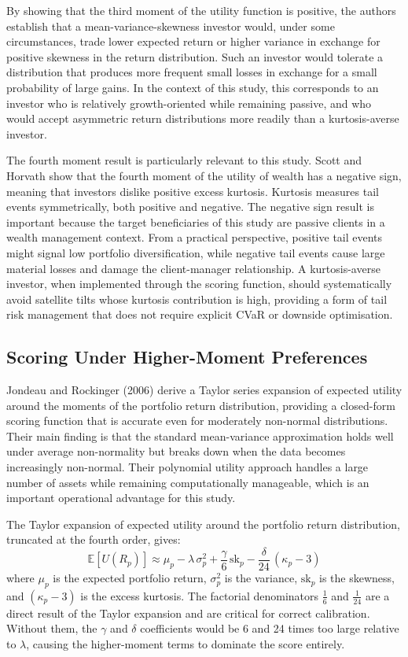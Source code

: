\documentclass[12pt, a4paper]{article}
\begin{document}
By showing that the third moment of the utility function is positive, the authors establish
that a mean-variance-skewness investor would, under some circumstances, trade lower expected
return or higher variance in exchange for positive skewness in the return distribution. Such
an investor would tolerate a distribution that produces more frequent small losses in exchange
for a small probability of large gains. In the context of this study, this corresponds to an
investor who is relatively growth-oriented while remaining passive, and who would accept
asymmetric return distributions more readily than a kurtosis-averse investor.

The fourth moment result is particularly relevant to this study. Scott and Horvath show that
the fourth moment of the utility of wealth has a negative sign, meaning that investors dislike
positive excess kurtosis. Kurtosis measures tail events symmetrically, both positive and
negative. The negative sign result is important because the target beneficiaries of this
study are passive clients in a wealth management context. From a practical perspective,
positive tail events might signal low portfolio diversification, while negative tail events
cause large material losses and damage the client-manager relationship. A kurtosis-averse
investor, when implemented through the scoring function, should systematically avoid satellite
tilts whose kurtosis contribution is high, providing a form of tail risk management that does
not require explicit CVaR or downside optimisation.

\subsection{Scoring Under Higher-Moment Preferences}

Jondeau and Rockinger (2006) derive a Taylor series expansion of expected utility around the
moments of the portfolio return distribution, providing a closed-form scoring function that
is accurate even for moderately non-normal distributions. Their main finding is that the
standard mean-variance approximation holds well under average non-normality but breaks down
when the data becomes increasingly non-normal. Their polynomial utility approach handles a
large number of assets while remaining computationally manageable, which is an important
operational advantage for this study.

The Taylor expansion of expected utility around the portfolio return distribution, truncated
at the fourth order, gives:
\begin{equation}
  \mathbb{E}\!\left[U(R_p)\right] \approx
  \mu_p
  - \lambda\,\sigma^2_p
  + \frac{\gamma}{6}\,\text{sk}_p
  - \frac{\delta}{24}\,(\kappa_p - 3)
  \label{eq:taylor_utility}
\end{equation}
where $\mu_p$ is the expected portfolio return, $\sigma^2_p$ is the variance,
$\text{sk}_p$ is the skewness, and $(\kappa_p - 3)$ is the excess kurtosis. The factorial
denominators $\tfrac{1}{6}$ and $\tfrac{1}{24}$ are a direct result of the Taylor expansion
and are critical for correct calibration. Without them, the $\gamma$ and $\delta$ coefficients
would be 6 and 24 times too large relative to $\lambda$, causing the higher-moment terms to
dominate the score entirely.
\end{document}
